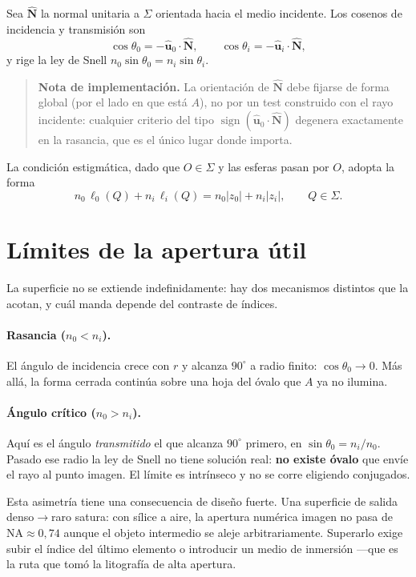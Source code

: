 \documentclass[11pt,a4paper]{article}
\newcommand{\ux}{\hat{\mathbf{u}}}
\newcommand{\nhat}{\hat{\mathbf{N}}}
\begin{document}
Sea $\nhat$ la normal unitaria a $\Sigma$ orientada hacia el medio incidente.
Los cosenos de incidencia y transmisión son
\begin{equation}
  \cos\theta_0=-\ux_0\cdot\nhat,\qquad \cos\theta_i=-\ux_i\cdot\nhat,
  \label{eq:cosines}
\end{equation}
y rige la ley de Snell $n_0\sin\theta_0=n_i\sin\theta_i$.

\begin{quote}\small
\textbf{Nota de implementación.} La orientación de $\nhat$ debe fijarse de
forma global (por el lado en que está $A$), no por un test construido con el
rayo incidente: cualquier criterio del tipo $\operatorname{sign}(\ux_0\cdot\nhat)$
degenera exactamente en la rasancia, que es el único lugar donde importa.
\end{quote}

La condición estigmática, dado que $O\in\Sigma$ y las esferas pasan por $O$,
adopta la forma
\begin{equation}
  n_0\,\ell_0(Q)+n_i\,\ell_i(Q)=n_0|z_0|+n_i|z_i|,\qquad Q\in\Sigma .
  \label{eq:stigmatic}
\end{equation}

\section{Límites de la apertura útil}
\label{sec:apertura}

La superficie no se extiende indefinidamente: hay dos mecanismos distintos que
la acotan, y cuál manda depende del contraste de índices.

\paragraph{Rasancia ($n_0<n_i$).} El ángulo de incidencia crece con $r$ y
alcanza $90^\circ$ a radio finito: $\cos\theta_0\to0$. Más allá, la forma
cerrada continúa sobre una hoja del óvalo que $A$ ya no ilumina.

\paragraph{Ángulo crítico ($n_0>n_i$).} Aquí es el ángulo \emph{transmitido}
el que alcanza $90^\circ$ primero, en $\sin\theta_0=n_i/n_0$. Pasado ese
radio la ley de Snell no tiene solución real: \textbf{no existe óvalo} que
envíe el rayo al punto imagen. El límite es intrínseco y no se corre eligiendo
conjugados.

Esta asimetría tiene una consecuencia de diseño fuerte. Una superficie de
salida denso$\to$raro satura: con sílice a aire, la apertura numérica imagen no
pasa de $\mathrm{NA}\approx0{,}74$ aunque el objeto intermedio se aleje
arbitrariamente. Superarlo exige subir el índice del último elemento o
introducir un medio de inmersión ---que es la ruta que tomó la litografía de
alta apertura.
\end{document}
